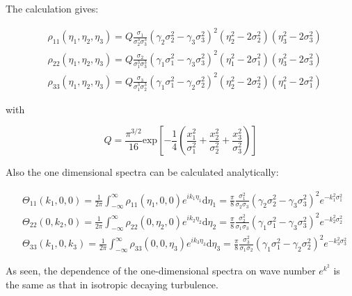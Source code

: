 \noindent The calculation gives:

\begin{equation} \label{anisotropicAutocorrelation}
\begin{split}
	&\rho_{11}(\eta_1,\eta_2,\eta_3)  = Q\frac{\sigma_1}{\sigma_2^3\sigma_3^3}\left(\gamma_2\sigma_2^2-\gamma_3\sigma_3^2\right)^2\left(\eta_2^2-2\sigma_2^2\right)\left(\eta_3^2-2\sigma_3^2\right) \\
	&\rho_{22}(\eta_1,\eta_2,\eta_3)  = Q\frac{\sigma_2}{\sigma_1^3\sigma_3^3}\left(\gamma_1\sigma_1^2-\gamma_3\sigma_3^2\right)^2\left(\eta_1^2-2\sigma_1^2\right)\left(\eta_3^2-2\sigma_3^2\right) \\
	&\rho_{33}(\eta_1,\eta_2,\eta_3)  = Q\frac{\sigma_3}{\sigma_1^3\sigma_2^3}\left(\gamma_1\sigma_1^2-\gamma_2\sigma_2^2\right)^2\left(\eta_2^2-2\sigma_2^2\right)\left(\eta_1^2-2\sigma_1^2\right)
\end{split}	
\end{equation}

\noindent with

\begin{equation}
	Q = \frac{\pi^{3/2}}{16}\mathrm{exp}\left[-\frac{1}{4}\left(\frac{x_1^2}{\sigma_1^2}+\frac{x_2^2}{\sigma_2^2}+\frac{x_3^2}{\sigma_3^2}\right)\right]
\end{equation}

\noindent Also the one dimensional spectra can be calculated analytically:

\begin{equation}
\begin{split}
	&\Theta_{11}(k_1,0,0) = \frac{1}{2\pi}\int_{-\infty}^{\infty}\rho_{11}(\eta_1,0,0)e^{ik_1\eta_1}\mathrm{d}\eta_1 = \frac{\pi}{8}\frac{\sigma_1^2}{\sigma_2\sigma_3}\left(\gamma_2\sigma_2^2-\gamma_3\sigma_3^2\right)^2 e^{-k_1^2\sigma_1^2} \\
	&\Theta_{22}(0,k_2,0) = \frac{1}{2\pi}\int_{-\infty}^{\infty}\rho_{22}(0,\eta_2,0)e^{ik_2\eta_2}\mathrm{d}\eta_2 = \frac{\pi}{8}\frac{\sigma_2^2}{\sigma_1\sigma_3}\left(\gamma_1\sigma_1^2-\gamma_3\sigma_3^2\right)^2 e^{-k_2^2\sigma_2^2} \\
	&\Theta_{33}(k_1,0,k_3) = \frac{1}{2\pi}\int_{-\infty}^{\infty}\rho_{33}(0,0,\eta_3)e^{ik_3\eta_3}\mathrm{d}\eta_3 = \frac{\pi}{8}\frac{\sigma_3^2}{\sigma_1\sigma_2}\left(\gamma_1\sigma_1^2-\gamma_2\sigma_2^2\right)^2 e^{-k_3^2\sigma_3^2}
\end{split}
\end{equation}

\noindent As seen, the dependence of the one-dimensional spectra on wave number $e^{k^2}$ is the same as that in isotropic decaying turbulence.

